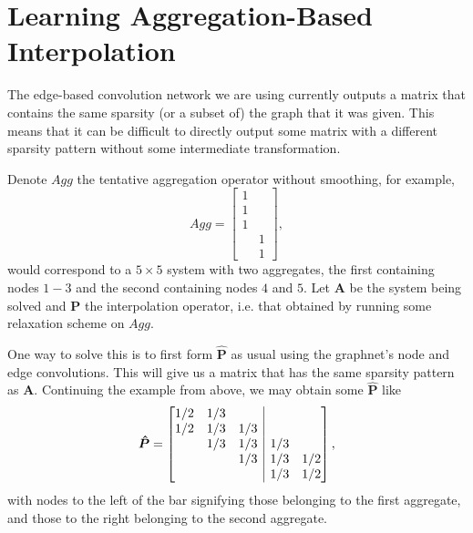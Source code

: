 \documentclass{article}
\newcommand{\mat}[1]{\bm{{#1}}}
\newcommand{\sfrac}[2]{#1/#2}
\begin{document}
\section{Learning Aggregation-Based Interpolation}

The edge-based convolution network we are using currently outputs a matrix that contains the same sparsity (or a subset of) the graph that it was given.  This means that it can be difficult to directly output some matrix with a different sparsity pattern without some intermediate transformation.

Denote $Agg$ the tentative aggregation operator without smoothing, for example,
\begin{equation}
Agg =
\begin{bmatrix}
  1 & \\
  1 & \\
  1 & \\
  & 1 \\
  & 1
\end{bmatrix},
\end{equation}
would correspond to a $5 \times 5$ system with two aggregates, the first containing nodes $1-3$ and the second containing nodes $4$ and $5$.  Let $\mat{A}$ be the system being solved and $\mat{P}$ the interpolation operator, i.e. that obtained by running some relaxation scheme on $Agg$.

One way to solve this is to first form $\mat{\hat{P}}$ as usual using the graphnet's node and edge convolutions.  This will give us a matrix that has the same sparsity pattern as $\mat{A}$.  Continuing the example from above, we may obtain some $\mat{\hat{P}}$ like
\begin{equation}
\mat{\hat{P}} =
\left[\begin{array}{@{}ccc|cc@{}}
  \sfrac{1}{2} & \sfrac{1}{3} & & & \\
  \sfrac{1}{2} & \sfrac{1}{3} & \sfrac{1}{3} & & \\
               & \sfrac{1}{3} & \sfrac{1}{3} & \sfrac{1}{3} &\\
               &              & \sfrac{1}{3} & \sfrac{1}{3} & \sfrac{1}{2} \\
  &              &              & \sfrac{1}{3} & \sfrac{1}{2}
\end{array}\right],
\end{equation}
with nodes to the left of the bar signifying those belonging to the first aggregate, and those to the right belonging to the second aggregate.
\end{document}
